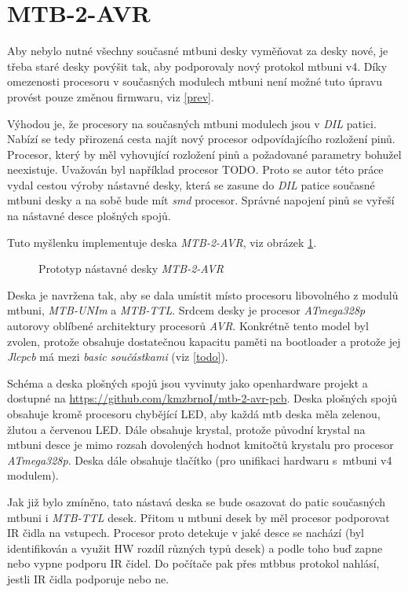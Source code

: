 \section{MTB-2-AVR}

Aby nebylo nutné všechny současné \gls{mtbuni} desky vyměňovat za desky nové,
je třeba staré desky povýšit tak, aby podporovaly nový protokol \gls{mtbuni} v4.
Díky omezenosti procesoru v současných modulech \gls{mtbuni} není možné tuto
úpravu provést pouze změnou firmwaru, viz \ref{prev}.

Výhodou je, že procesory na současných \gls{mtbuni} modulech jsou v
\textit{DIL} patici. Nabízí se tedy přirozená cesta najít nový procesor
odpovídajícího rozložení pinů. Procesor, který by měl vyhovující rozložení pinů
a požadované parametry bohužel neexistuje. Uvažován byl například procesor
TODO. Proto se autor této práce vydal cestou výroby nástavné desky, která se
zasune do \textit{DIL} patice současné \gls{mtbuni} desky a na sobě bude mít
\textit{smd} procesor.  Správné napojení pinů se vyřeší na nástavné desce
plošných spojů.

Tuto myšlenku implementuje deska \textit{MTB-2-AVR}, viz obrázek
\ref{fig:mtb-2-avr}.

\begin{figure}[ht]
\caption{Prototyp nástavné desky \textit{MTB-2-AVR}}
\label{fig:mtb-2-avr}
\end{figure}

Deska je navržena tak, aby se dala umístit místo procesoru libovolného z modulů
\gls{mtbuni}, \textit{MTB-UNIm} a \textit{MTB-TTL}. Srdcem desky je procesor
\textit{ATmega328p} autorovy oblíbené architektury procesorů \textit{AVR}.
Konkrétně tento model byl zvolen, protože obsahuje dostatečnou kapacitu paměti
na bootloader a protože jej \textit{Jlcpcb} má mezi \textit{basic součástkami}
(viz \ref{todo}).

Schéma a deska plošných spojů jsou vyvinuty jako openhardware projekt a dostupné
na \url{https://github.com/kmzbrnoI/mtb-2-avr-pcb}. Deska plošných spojů obsahuje
kromě procesoru chybějící LED, aby každá \gls{mtb} deska měla zelenou, žlutou a
červenou LED. Dále obsahuje krystal, protože původní krystal na \gls{mtbuni}
desce je mimo rozsah dovolených hodnot kmitočtů krystalu pro procesor
\textit{ATmega328p}. Deska dále obsahuje tlačítko (pro unifikaci hardwaru
s~\gls{mtbuni} v4 modulem).

Jak již bylo zmíněno, tato nástavá deska se bude osazovat do patic současných
\gls{mtbuni} i \textit{MTB-TTL} desek. Přitom u \gls{mtbuni} desek by měl procesor
podporovat IR čidla na vstupech. Procesor proto detekuje v jaké desce se nachází
(byl identifikován a využit HW rozdíl různých typů desek) a podle toho buď
zapne nebo vypne podporu IR čidel. Do počítače pak přes \gls{mtbbus} protokol
nahlásí, jestli IR čidla podporuje nebo ne.

